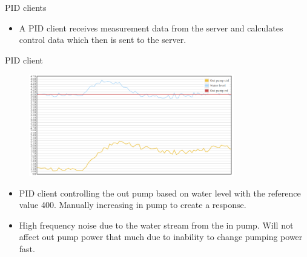 \documentclass{beamer}
\begin{document}
\begin{frame}{PID clients}
	\begin{itemize}
		\item A PID client receives measurement data from the server and calculates control data which then is sent to the server.            
	\end{itemize}
\end{frame}

\begin{frame}{PID client}
	\begin{figure}
		\center
		\includegraphics[width=0.8\textwidth]{plot1.png}
	\end{figure}
	\begin{itemize}
		\item PID client controlling the out pump based on water level with the reference value 400. Manually increasing in pump to create a response.
		\item High frequency noise due to the water stream from the in pump. Will not affect out pump power that much due to inability to change pumping power fast.
    \end{itemize}
\end{frame}
\end{document}
